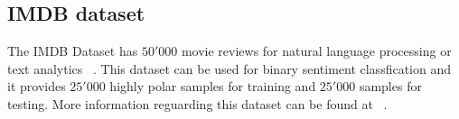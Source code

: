 \subsection{IMDB dataset}
\label{subsec:imdb}
The IMDB Dataset has $50'000$ movie reviews for natural language processing or text analytics ~\cite{kaggle}. This dataset can be used for binary sentiment classfication 
and it provides $25'000$ highly polar samples for training and $25'000$ samples for testing. More information reguarding this dataset can be found at ~\cite{refe}.
